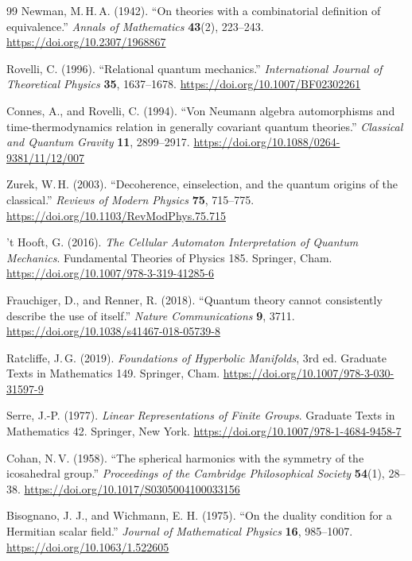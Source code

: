 \documentclass[11pt]{article}
\theoremstyle{definition}
\theoremstyle{remark}
\begin{document}
{\begin{thebibliography}{99}
Newman, M.\,H.\,A. (1942). ``On theories with a combinatorial definition of
equivalence.'' \emph{Annals of Mathematics} \textbf{43}(2), 223--243.
\url{https://doi.org/10.2307/1968867}

Rovelli, C. (1996). ``Relational quantum mechanics.''
\emph{International Journal of Theoretical Physics} \textbf{35},
1637--1678.
\url{https://doi.org/10.1007/BF02302261}

Connes, A., and Rovelli, C. (1994). ``Von Neumann algebra automorphisms and
time-thermodynamics relation in generally covariant quantum theories.''
\emph{Classical and Quantum Gravity} \textbf{11}, 2899--2917.
\url{https://doi.org/10.1088/0264-9381/11/12/007}

Zurek, W.\,H. (2003). ``Decoherence, einselection, and the quantum
origins of the classical.'' \emph{Reviews of Modern Physics}
\textbf{75}, 715--775.
\url{https://doi.org/10.1103/RevModPhys.75.715}

't Hooft, G. (2016). \emph{The Cellular Automaton Interpretation of
Quantum Mechanics}. Fundamental Theories of Physics 185. Springer, Cham.
\url{https://doi.org/10.1007/978-3-319-41285-6}

Frauchiger, D., and Renner, R. (2018). ``Quantum theory cannot
consistently describe the use of itself.'' \emph{Nature Communications}
\textbf{9}, 3711.
\url{https://doi.org/10.1038/s41467-018-05739-8}

Ratcliffe, J.\,G. (2019). \emph{Foundations of Hyperbolic Manifolds},
3rd ed. Graduate Texts in Mathematics 149. Springer, Cham.
\url{https://doi.org/10.1007/978-3-030-31597-9}

Serre, J.-P. (1977). \emph{Linear Representations of Finite Groups}.
Graduate Texts in Mathematics 42. Springer, New York.
\url{https://doi.org/10.1007/978-1-4684-9458-7}

Cohan, N.\,V. (1958). ``The spherical harmonics with the symmetry of the
icosahedral group.'' \emph{Proceedings of the Cambridge Philosophical
Society} \textbf{54}(1), 28--38.
\url{https://doi.org/10.1017/S0305004100033156}

Bisognano, J. J., and Wichmann, E. H. (1975). ``On the duality condition for
a Hermitian scalar field.'' \emph{Journal of Mathematical Physics}
\textbf{16}, 985--1007.
\url{https://doi.org/10.1063/1.522605}


\end{thebibliography}}
\end{document}
